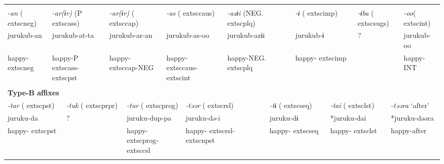 \tabletail{}
\tablelasttail{}
\begin{tabularx}{\textwidth}{XXXXXXXXXm{}XXXXXXXXX}
\lsptoprule
\multicolumn{19}{X}{{\bfseries Type-A affixes}}\\
\multicolumn{2}{X}{{ \textit{{}-an} (	extsc{neg})}} & \multicolumn{4}{X}{{ \textit{{}-ar(ɨr)} (P	extsc{ass})}} & \multicolumn{3}{X}{{ \textit{{}-ar(ɨr)} (	extsc{cap})}} & \multicolumn{3}{X}{{ \textit{{}-as} (	extsc{caus})}} & \multicolumn{2}{X}{{ \textit{{}-azɨi} (NEG.	extsc{plq})}} & \multicolumn{2}{X}{{ \textit{{}-ɨ} (	extsc{imp})}} & \multicolumn{2}{X}{{ \textit{{}-ɨba} (	extsc{sugs})}} & { \textit{{}-oo}(	extsc{int})}\\
\multicolumn{2}{X}{{ jurukub-an}} & \multicolumn{4}{X}{{ jurukub-at-ta}} & \multicolumn{3}{X}{{ jurukub-ar-an}} & \multicolumn{3}{X}{{ jurukub-as-oo}} & \multicolumn{2}{X}{{ jurukub-azɨi}} & \multicolumn{2}{X}{{ jurukub-ɨ}} & \multicolumn{2}{X}{{ ?}} & { jurukub-oo}\\
\multicolumn{2}{X}{happy-	extsc{neg}} & \multicolumn{4}{X}{happy-P	extsc{ass}-	extsc{pst}} & \multicolumn{3}{X}{happy-	extsc{cap}-NEG} & \multicolumn{3}{X}{happy-	extsc{caus}-	extsc{int}} & \multicolumn{2}{X}{happy-NEG.	extsc{plq}} & \multicolumn{2}{X}{happy-	extsc{imp}} & \multicolumn{2}{X}{} & happy-INT\\
\multicolumn{19}{X}{}\\
\multicolumn{19}{X}{{\bfseries Type-B affixes}}\\
\multicolumn{3}{X}{{ \textit{{}-tar} (	extsc{pst})}} & \multicolumn{4}{X}{{ \textit{{}-tuk} (	extsc{prpr})}} & \multicolumn{4}{X}{{ \textit{{}-tur} (	extsc{prog})}} & \multicolumn{2}{X}{{ \textit{{}-təər} (	extsc{rsl})}} & \multicolumn{2}{X}{{ \textit{{}-tɨ} (	extsc{seq})}} & \multicolumn{2}{X}{{ \textit{{}-tai} (	extsc{lst})}} & \multicolumn{2}{X}{{ \textit{{}-təəra} ‘after’}}\\
\multicolumn{3}{X}{{ juruku-da}} & \multicolumn{4}{X}{{ ?}} & \multicolumn{4}{X}{{ juruku-dup-pa}} & \multicolumn{2}{X}{{ juruku-də-i}} & \multicolumn{2}{X}{{ juruku-dɨ}} & \multicolumn{2}{X}{{ *juruku-dai}} & \multicolumn{2}{X}{{ *juruku-dəəra}}\\
\multicolumn{3}{X}{happy-	extsc{pst}} & \multicolumn{4}{X}{} & \multicolumn{4}{X}{happy-	extsc{prog}-	extsc{csl}} & \multicolumn{2}{X}{happy-	extsc{rsl}-	extsc{npst}} & \multicolumn{2}{X}{happy-	extsc{seq}} & \multicolumn{2}{X}{happy-	extsc{lst}} & \multicolumn{2}{X}{{ happy-after}}\\
\multicolumn{3}{X}{} & \multicolumn{4}{X}{} & \multicolumn{4}{X}{} & \multicolumn{2}{X}{} & \multicolumn{2}{X}{} & \multicolumn{2}{X}{} & \multicolumn{2}{X}{}\\

\end{tabularx}
